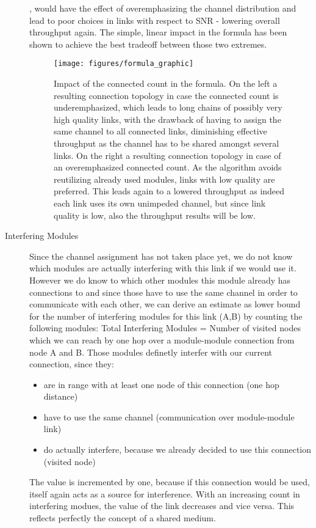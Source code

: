 \begin{description}
	  , would have the effect of overemphasizing 
	  the channel distribution and lead to poor choices in links with respect to SNR - lowering overall throughput again.
	  The simple, linear impact in the formula has been shown to achieve the best tradeoff between those two extremes.
	  
	  \begin{figure}[h]
	    \centering
	    \texttt{[image: figures/formula\_graphic]}
	    \caption{Impact of the connected count in the formula. On the left a resulting connection topology in case the connected count is underemphasized,
	      which leads to long chains of possibly very high quality links, with the drawback of having to assign the same channel to all connected links, 
	      diminishing effective throughput as the channel has to be shared amongst several links. 
	      On the right a resulting connection topology in case of an overemphasized connected count. As the algorithm avoids reutilizing already used modules,
	      links with low quality are preferred. This leads again to a lowered throughput as indeed each link uses its own unimpeded channel, but since link quality is low, also 
	      the throughput results will be low.}
	    \label{fig:formula_graphic}
	  \end{figure}
	  
	\item[Interfering Modules]
	  Since the channel assignment has not taken place yet, we do not know which modules are actually interfering with this link if we would use it.
	  However we do know to which other modules this module already has connections to and since those have to use the same channel in order to communicate with each
	  other, we can derive an estimate as lower bound for the number of interfering modules for this link (A,B) by counting the following modules:
	  Total Interfering Modules = Number of visited nodes which we can reach by one hop over a module-module connection from node A and B.
	  Those modules definetly interfer with our current connection, since they:
	  
	  \begin{itemize}
	  \item are in range with at least one node of this connection (one hop distance)
	  
	  \item have to use the same channel (communication over module-module link)
	  
	  \item do actually interfere, because we already decided to use this connection (visited node)
	  \end{itemize}

	  The value is incremented by one, because if this connection would be used, itself again acts as a source for interference.
	  With an increasing count in interfering modues, the value of the link decreases and vice versa. This reflects perfectly the concept of a shared medium.
      \end{description}
      
